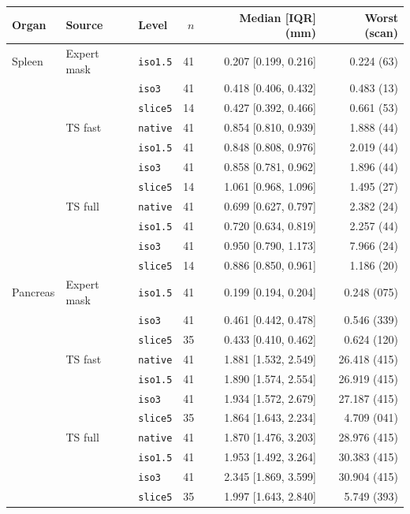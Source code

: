 \begin{tabular}{lllrrr}
\toprule
Organ & Source & Level & $n$ & Median [IQR] (mm) & Worst (scan) \\
\midrule
Spleen & Expert mask & \texttt{iso1.5} & 41 & 0.207 [0.199, 0.216] & 0.224 (63) \\
 &  & \texttt{iso3} & 41 & 0.418 [0.406, 0.432] & 0.483 (13) \\
 &  & \texttt{slice5} & 14 & 0.427 [0.392, 0.466] & 0.661 (53) \\
 & TS fast & \texttt{native} & 41 & 0.854 [0.810, 0.939] & 1.888 (44) \\
 &  & \texttt{iso1.5} & 41 & 0.848 [0.808, 0.976] & 2.019 (44) \\
 &  & \texttt{iso3} & 41 & 0.858 [0.781, 0.962] & 1.896 (44) \\
 &  & \texttt{slice5} & 14 & 1.061 [0.968, 1.096] & 1.495 (27) \\
 & TS full & \texttt{native} & 41 & 0.699 [0.627, 0.797] & 2.382 (24) \\
 &  & \texttt{iso1.5} & 41 & 0.720 [0.634, 0.819] & 2.257 (44) \\
 &  & \texttt{iso3} & 41 & 0.950 [0.790, 1.173] & 7.966 (24) \\
 &  & \texttt{slice5} & 14 & 0.886 [0.850, 0.961] & 1.186 (20) \\
\midrule
Pancreas & Expert mask & \texttt{iso1.5} & 41 & 0.199 [0.194, 0.204] & 0.248 (075) \\
 &  & \texttt{iso3} & 41 & 0.461 [0.442, 0.478] & 0.546 (339) \\
 &  & \texttt{slice5} & 35 & 0.433 [0.410, 0.462] & 0.624 (120) \\
 & TS fast & \texttt{native} & 41 & 1.881 [1.532, 2.549] & 26.418 (415) \\
 &  & \texttt{iso1.5} & 41 & 1.890 [1.574, 2.554] & 26.919 (415) \\
 &  & \texttt{iso3} & 41 & 1.934 [1.572, 2.679] & 27.187 (415) \\
 &  & \texttt{slice5} & 35 & 1.864 [1.643, 2.234] & 4.709 (041) \\
 & TS full & \texttt{native} & 41 & 1.870 [1.476, 3.203] & 28.976 (415) \\
 &  & \texttt{iso1.5} & 41 & 1.953 [1.492, 3.264] & 30.383 (415) \\
 &  & \texttt{iso3} & 41 & 2.345 [1.869, 3.599] & 30.904 (415) \\
 &  & \texttt{slice5} & 35 & 1.997 [1.643, 2.840] & 5.749 (393) \\
\bottomrule
\end{tabular}
